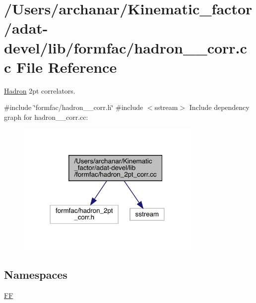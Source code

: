 \hypertarget{adat-devel_2lib_2formfac_2hadron__2pt__corr_8cc}{}\section{/\+Users/archanar/\+Kinematic\+\_\+factor/adat-\/devel/lib/formfac/hadron\+\_\+2pt\+\_\+corr.cc File Reference}
\label{adat-devel_2lib_2formfac_2hadron__2pt__corr_8cc}


\mbox{\hyperlink{namespaceHadron}{Hadron}} 2pt correlators.  


{\ttfamily \#include \char`\"{}formfac/hadron\+\_\+2pt\+\_\+corr.\+h\char`\"{}}\newline
{\ttfamily \#include $<$sstream$>$}\newline
Include dependency graph for hadron\+\_\+2pt\+\_\+corr.\+cc\+:
\nopagebreak
\begin{figure}[H]
\begin{center}
\leavevmode
\includegraphics[width=252pt]{df/d57/adat-devel_2lib_2formfac_2hadron__2pt__corr_8cc__incl}
\end{center}
\end{figure}
\subsection*{Namespaces}
\begin{DoxyCompactItemize}
\item 
 \mbox{\hyperlink{namespaceFF}{FF}}
\end{DoxyCompactItemize}
